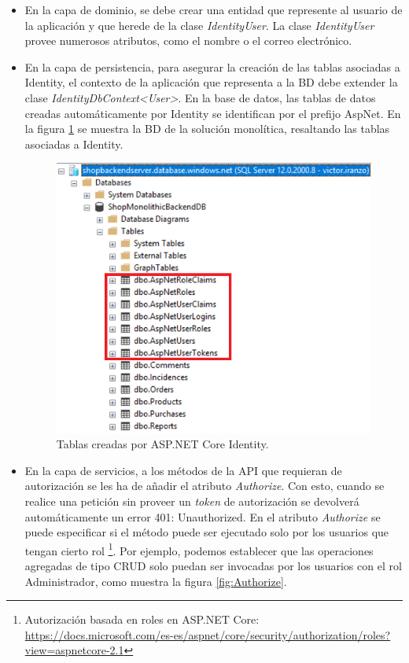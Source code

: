 \documentclass[11pt,spanish,listoffigures]{tfgetsinf}
\begin{document}
\begin{itemize}

\item En la capa de dominio, se debe crear una entidad que represente al usuario de la aplicación y que herede de la clase \textit{IdentityUser}. La clase \textit{IdentityUser} provee numerosos atributos, como el nombre o el correo electrónico.

\item En la capa de persistencia, para asegurar la creación de las tablas asociadas a Identity, el contexto de la aplicación que representa a la BD debe extender la clase \textit{IdentityDbContext<User>}. En la base de datos, las tablas de datos creadas automáticamente por Identity se identifican por el prefijo AspNet. En la figura \ref{fig:BDMonolitica} se muestra la BD de la solución monolítica, resaltando las tablas asociadas a Identity.

\begin{figure}[h]
\centering
\includegraphics[scale=0.8]{BDMonolitica}
\caption{Tablas creadas por ASP.NET Core Identity.}
\label{fig:BDMonolitica}
\end{figure}

\item En la capa de servicios, a los métodos de la API que requieran de autorización se les ha de añadir el atributo \textit{Authorize}. Con esto, cuando se realice una petición sin proveer un \textit{token} de autorización se devolverá automáticamente un error 401: Unauthorized. En el atributo \textit{Authorize} se puede especificar si el método puede ser ejecutado solo por los usuarios que tengan cierto rol \footnote{ Autorización basada en roles en ASP.NET Core: \url{https://docs.microsoft.com/es-es/aspnet/core/security/authorization/roles?view=aspnetcore-2.1}}. Por ejemplo, podemos establecer que las operaciones agregadas de tipo CRUD solo puedan ser invocadas por los usuarios con el rol Administrador, como muestra la figura \ref{fig:Authorize}.


\end{itemize}
\end{document}
